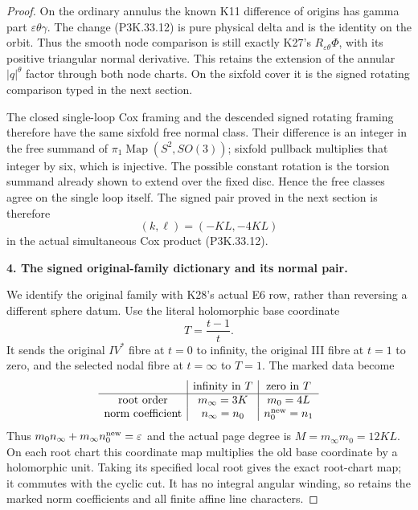 \begin{proof}
On the ordinary annulus the known K11 difference of origins
has gamma part \(\varepsilon\theta\gamma\). The change (P3K.33.12) is pure
physical delta and is the identity on the orbit. Thus the
smooth node comparison is still exactly K27's
\(R_{\varepsilon\theta}\Phi\), with its positive triangular normal
derivative. This retains the extension of the annular
\(|q|^\theta\) factor through both node charts. On the
sixfold cover it is the signed rotating comparison typed in the
next section.

The closed single-loop Cox framing and the descended signed rotating
framing therefore have the same sixfold free normal class.
Their difference is an integer in the free summand of
\(\pi_1\operatorname{Map}(S^2,SO(3))\); sixfold pullback
multiplies that integer by six, which is injective. The possible
constant rotation is the torsion summand already shown to extend
over the fixed disc. Hence the free classes agree on the single
loop itself. The signed pair proved in the next section is therefore
\[
                       (k,\ell)=(-KL,-4KL)
\]
in the actual simultaneous Cox product (P3K.33.12).

\par\medskip\noindent\textbf{4. The signed original-family dictionary and its normal pair.}\enspace

We identify the original family with K28's actual E6 row, rather
than reversing a different sphere datum. Use the literal holomorphic
base coordinate
\[
             T=\frac{t-1}{t}.
\]
It sends the original \(IV^*\) fibre at \(t=0\) to infinity,
the original III fibre at \(t=1\) to zero, and the selected nodal
fibre at \(t=\infty\) to \(T=1\). The marked data become
\[
\begin{array}{c|c|c}
 &\text{infinity in }T&\text{zero in }T\\\hline
 \text{root order}&m_\infty=3K&m_0=4L\\
 \text{norm coefficient}&n_\infty=n_0&n_0^{\rm new}=n_1
\end{array}
\]
Thus \(m_0n_\infty+m_\infty n_0^{\rm new}=\varepsilon\)
and the actual page degree is \(M=m_\infty m_0=12KL\).
On each root chart this coordinate map multiplies the old base
coordinate by a holomorphic unit. Taking its specified local root
gives the exact root-chart map; it commutes with the cyclic cut.
It has no integral angular winding, so retains the marked norm
coefficients and all finite affine line characters.


\end{proof}
